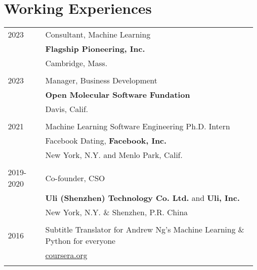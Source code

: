 \section{Working Experiences}
\begin{longtable}{p{} p{} }
\textsc{2023} & Consultant, Machine Learning \\
& \textbf{Flagship Pioneering, Inc.} \\
& Cambridge, Mass.\\\\
\textsc{2023} & Manager, Business Development \\
& \textbf{Open Molecular Software Fundation} \\
& Davis, Calif. \\\\
\textsc{2021} & Machine Learning Software Engineering Ph.D. Intern\\
 & Facebook Dating, \textbf{Facebook, Inc.}\\
 & New York, N.Y. and Menlo Park, Calif.\\\\
\textsc{2019-2020} & Co-founder, CSO\\
                 & \textbf{Uli (Shenzhen) Technology Co. Ltd.} and \textbf{Uli, Inc.}\\
                 & New York, N.Y. \& Shenzhen, P.R. China\\\\

 \textsc{2016} & Subtitle Translator for 
 Andrew Ng's Machine Learning \& Python for everyone\\
 & \url{coursera.org} \\\\
\end{longtable}




